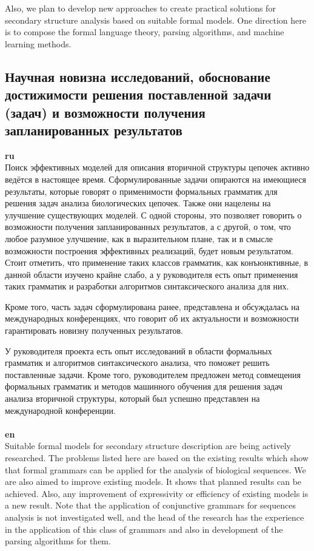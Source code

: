 \documentclass[12pt]{article}  %
\theoremstyle{remark}
\begin{document}
Also, we plan to develop new approaches to create practical solutions for secondary structure analysis based on suitable formal models.
One direction here is to compose the formal language theory, parsing algorithms, and machine learning methods.

\subsection{Научная новизна исследований, обоснование достижимости решения поставленной задачи (задач) и возможности получения запланированных результатов}

\textbf{ru}\\
Поиск эффективных моделей для описания вторичной структуры цепочек активно ведётся в настоящее время.
Сформулированные задачи опираются на имеющиеся результаты, которые говорят о применимости формальных грамматик для решения задач анализа биологических цепочек. Также они нацелены на улучшение существующих моделей.
С одной стороны, это позволяет говорить о возможности получения запланированных результатов, а с другой, о том, что любое разумное улучшение, как в выразительном плане, так и в смысле возможности построения эффективных реализаций, будет новым результатом.
Стоит отметить, что применение таких классов грамматик, как конъюнктивные, в данной области изучено крайне слабо, а у руководителя есть опыт применения таких грамматик и разработки алгоритмов синтаксического анализа для них.

Кроме того, часть задач сформулирована ранее, представлена и обсуждалась на международных конференциях, что говорит об их актуальности и возможности гарантировать новизну полученных результатов.

У руководителя проекта есть опыт исследований в области формальных грамматик и алгоритмов синтаксического анализа, что поможет решить поставленные задачи.
Кроме того, руководителем предложен метод совмещения формальных грамматик и методов машинного обучения для решения задач анализа вторичной структуры, который был успешно представлен на международной конференции.
\\
\\
\textbf{en}\\
Suitable formal models for secondary structure description are being actively researched.
The problems listed here are based on the existing results which show that formal grammars can be applied for the analysis of biological sequences.
We are also aimed to improve existing models.
It shows that planned results can be achieved. Also, any improvement of expressivity or efficiency of existing models is a new result.
Note that the application of conjunctive grammars for sequences analysis is not investigated well, and the head of the research has the experience in the application of this class of grammars and also in development of the parsing algorithms for them.
\end{document}
